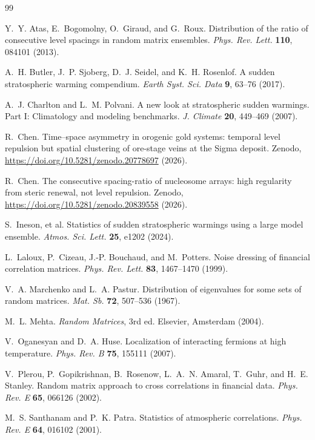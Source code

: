 \documentclass[11pt]{article}
\begin{document}
\begin{thebibliography}{99}

Y.~Y. Atas, E.~Bogomolny, O.~Giraud, and G.~Roux.
Distribution of the ratio of consecutive level spacings in random matrix
ensembles. \textit{Phys. Rev. Lett.} \textbf{110}, 084101 (2013).

A.~H. Butler, J.~P. Sjoberg, D.~J. Seidel, and K.~H. Rosenlof.
A sudden stratospheric warming compendium.
\textit{Earth Syst. Sci. Data} \textbf{9}, 63--76 (2017).

A.~J. Charlton and L.~M. Polvani.
A new look at stratospheric sudden warmings. Part I: Climatology and modeling
benchmarks. \textit{J. Climate} \textbf{20}, 449--469 (2007).

R.~Chen.
Time--space asymmetry in orogenic gold systems: temporal level repulsion but
spatial clustering of ore-stage veins at the Sigma deposit. Zenodo,
\url{https://doi.org/10.5281/zenodo.20778697} (2026).

R.~Chen.
The consecutive spacing-ratio of nucleosome arrays: high regularity from steric
renewal, not level repulsion. Zenodo, \url{https://doi.org/10.5281/zenodo.20839558}
(2026).

S.~Ineson, et al.
Statistics of sudden stratospheric warmings using a large model ensemble.
\textit{Atmos. Sci. Lett.} \textbf{25}, e1202 (2024).

L.~Laloux, P.~Cizeau, J.-P. Bouchaud, and M.~Potters.
Noise dressing of financial correlation matrices.
\textit{Phys. Rev. Lett.} \textbf{83}, 1467--1470 (1999).

V.~A. Marchenko and L.~A. Pastur.
Distribution of eigenvalues for some sets of random matrices.
\textit{Mat. Sb.} \textbf{72}, 507--536 (1967).

M.~L. Mehta. \textit{Random Matrices}, 3rd ed. Elsevier, Amsterdam (2004).

V.~Oganesyan and D.~A. Huse.
Localization of interacting fermions at high temperature.
\textit{Phys. Rev. B} \textbf{75}, 155111 (2007).

V.~Plerou, P.~Gopikrishnan, B.~Rosenow, L.~A.~N. Amaral, T.~Guhr, and
H.~E. Stanley.
Random matrix approach to cross correlations in financial data.
\textit{Phys. Rev. E} \textbf{65}, 066126 (2002).

M.~S. Santhanam and P.~K. Patra.
Statistics of atmospheric correlations.
\textit{Phys. Rev. E} \textbf{64}, 016102 (2001).

\end{thebibliography}
\end{document}
